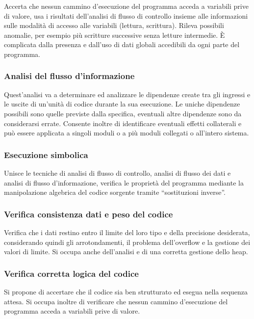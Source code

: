Accerta che nessun cammino d'esecuzione del programma acceda a variabili prive
di valore, usa i risultati dell'analisi di flusso di controllo insieme alle
informazioni sulle modalit\`a di accesso alle variabili (lettura, scrittura).
Rileva possibili anomalie, per esempio pi\`u scritture successive senza letture
intermedie. \`E complicata dalla presenza e dall'uso di dati globali accedibili
da ogni parte del programma.

\subsubsection{Analisi del flusso d'informazione}

Quest'analisi va a determinare ed analizzare le dipendenze create tra gli
ingressi e le uscite di un'unit\`a di codice durante la sua esecuzione. Le uniche
dipendenze possibili sono quelle previste dalla specifica, eventuali altre
dipendenze sono da considerarsi errate. Consente inoltre di identificare
eventuali effetti collaterali e pu\`o essere applicata a singoli moduli o a pi\`u
moduli collegati o all'intero sistema.

\subsubsection{Esecuzione simbolica}

Unisce le tecniche di analisi di flusso di controllo, analisi di flusso dei dati
e analisi di flusso d'informazione, verifica le propriet\`a del programma mediante
la manipolazione algebrica del codice sorgente tramite ``sostituzioni inverse''.

\subsubsection{Verifica consistenza dati e peso del codice}

Verifica che i dati restino entro il limite del loro tipo e della precisione
desiderata, considerando quindi gli arrotondamenti, il problema dell'overflow e
la gestione dei valori di limite. Si occupa anche dell'analisi e di una corretta
gestione dello heap.

\subsubsection{Verifica corretta logica del codice}

Si propone di accertare che il codice sia ben strutturato ed esegua nella
sequenza attesa. Si occupa inoltre di verificare che nessun cammino
d'esecuzione del programma acceda a variabili prive di valore.

